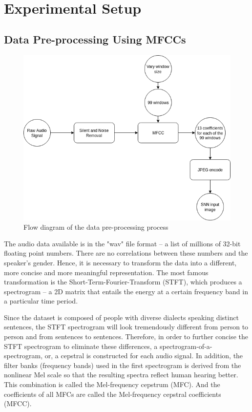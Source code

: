 \documentclass[11pt]{article}  %
\begin{document}
\section{Experimental Setup}
\label{experimental_setup}

\subsection{Data Pre-processing Using MFCCs}

\begin{figure}[!htb]
	\centering
	\includegraphics[width=0.6\linewidth]{"data preprocessing"}
	\caption{Flow diagram of the data pre-processing process}
	\label{fig:data-preprocessing}
\end{figure}


The audio data available is in the "wav" file format -- a list of millions of 32-bit floating point numbers. There are no correlations between these numbers and the speaker's gender. Hence, it is necessary to transform the data into a different, more concise and more meaningful representation. The most famous transformation is the Short-Term-Fourier-Transform (STFT), which produces a spectrogram -- a 2D matrix that entails the energy at a certain frequency band in a particular time period. 

Since the dataset is composed of people with diverse dialects speaking distinct sentences, the STFT spectrogram will look tremendously different from person to person and from sentences to sentences. Therefore, in order to further concise the STFT spectrogram to eliminate these differences, a spectrogram-of-a-spectrogram, or, a cepstral is constructed for each audio signal. In addition, the filter banks (frequency bands) used in the first spectrogram is derived from the nonlinear Mel scale \cite{b8} so that the resulting spectra reflect human hearing better. This combination is called the Mel-frequency cepstrum (MFC). And the coefficients of all MFCs are called the Mel-frequency cepstral coefficients (MFCC).
\end{document}
